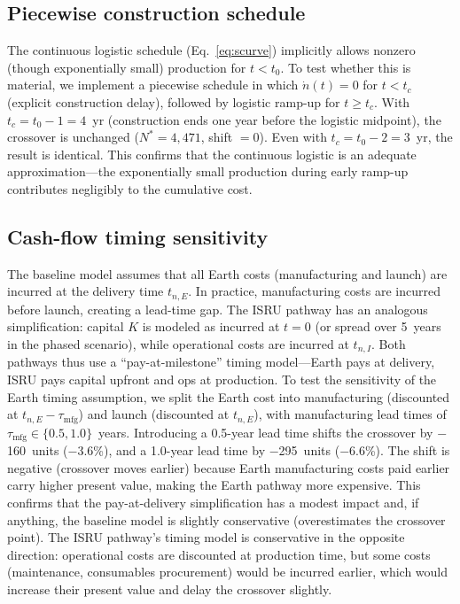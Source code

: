 \documentclass[preprint,12pt]{elsarticle}
\begin{document}
\subsection{Piecewise construction schedule}
\label{sec:piecewise_schedule}

The continuous logistic schedule (Eq.~\ref{eq:scurve}) implicitly allows nonzero (though exponentially small) production for $t < t_0$. To test whether this is material, we implement a piecewise schedule in which $\dot{n}(t) = 0$ for $t < t_c$ (explicit construction delay), followed by logistic ramp-up for $t \geq t_c$. With $t_c = t_0 - 1 = 4$~yr (construction ends one year before the logistic midpoint), the crossover is unchanged ($N^* = 4{,}471$, shift $= 0$). Even with $t_c = t_0 - 2 = 3$~yr, the result is identical. This confirms that the continuous logistic is an adequate approximation---the exponentially small production during early ramp-up contributes negligibly to the cumulative cost.

\subsection{Cash-flow timing sensitivity}
\label{sec:cashflow_timing}

The baseline model assumes that all Earth costs (manufacturing and launch) are incurred at the delivery time $t_{n,E}$. In practice, manufacturing costs are incurred before launch, creating a lead-time gap. The ISRU pathway has an analogous simplification: capital $K$ is modeled as incurred at $t = 0$ (or spread over 5~years in the phased scenario), while operational costs are incurred at $t_{n,I}$. Both pathways thus use a ``pay-at-milestone'' timing model---Earth pays at delivery, ISRU pays capital upfront and ops at production. To test the sensitivity of the Earth timing assumption, we split the Earth cost into manufacturing (discounted at $t_{n,E} - \tau_{\mathrm{mfg}}$) and launch (discounted at $t_{n,E}$), with manufacturing lead times of $\tau_{\mathrm{mfg}} \in \{0.5, 1.0\}$~years. Introducing a 0.5-year lead time shifts the crossover by $-$160~units ($-$3.6\%), and a 1.0-year lead time by $-$295~units ($-$6.6\%). The shift is negative (crossover moves earlier) because Earth manufacturing costs paid earlier carry higher present value, making the Earth pathway more expensive. This confirms that the pay-at-delivery simplification has a modest impact and, if anything, the baseline model is slightly conservative (overestimates the crossover point). The ISRU pathway's timing model is conservative in the opposite direction: operational costs are discounted at production time, but some costs (maintenance, consumables procurement) would be incurred earlier, which would increase their present value and delay the crossover slightly.
\end{document}
